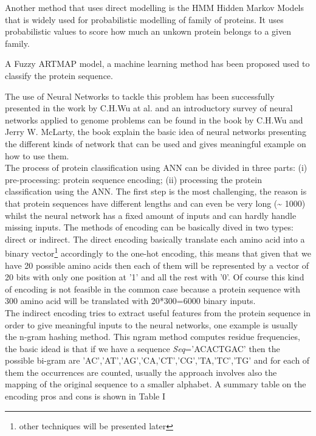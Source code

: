 \documentclass[a4paper, 10pt, conference]{ieeeconf}      %
\begin{document}
Another method that uses direct modelling is the HMM
Hidden Markov Models that is widely used for probabilistic
modelling of family of proteins. It uses probabilistic values
to score how much an unkown protein belongs to a given
family.

A Fuzzy ARTMAP model, a machine learning method has been proposed used to classify the protein sequence\cite{fuzzy}.

The use of Neural Networks to tackle this problem has been successfully presented in the work by C.H.Wu at al.\cite{wu1992}\cite{wu1995}\cite{wu1996} and an introductory survey of neural networks applied to genome problems can be found in the book by C.H.Wu and Jerry W. McLarty\cite{bookWu}, the book explain the basic idea of neural networks presenting the different kinds of network that can be used and gives meaningful example on how to use them.\\
The process of protein classification using ANN can be
divided in three parts: (i) pre-processing: protein sequence
encoding; (ii) processing the protein classification using the
ANN. The first step is the most challenging, the reason is that protein sequences have different lengths and can even be very long (\textasciitilde
1000) whilst the neural network has a fixed amount of inputs and can hardly handle missing inputs. The methods of encoding can be basically dived in two types\cite{bookWu}: direct or indirect. The direct encoding basically translate each amino acid into a binary vector\footnote{other techniques will be presented later} accordingly to the one-hot encoding, this means that given that we have 20 possible amino acids then each of them will be represented by a vector of 20 bits with only one position at '1' and all the rest with '0'. Of course this kind of encoding is not feasible in the common case because a protein sequence with 300 amino acid will be translated with 20*300=6000 binary inputs.\\
The indirect encoding tries to extract useful features from the protein sequence in order to give meaningful inputs to the neural networks, one example is usually the n-gram hashing method\cite{wu1992}. This ngram method computes residue frequencies, the basic idead is that if we have a sequence \textit{Seq}='ACACTGAC' then the possible bi-gram are 'AC','AT','AG','CA,'CT','CG','TA,'TC','TG' and for each of them the occurrences are counted, usually the approach involves also the mapping of the original sequence to a smaller alphabet. A summary table on the encoding pros and cons is shown in Table I\\
\end{document}
